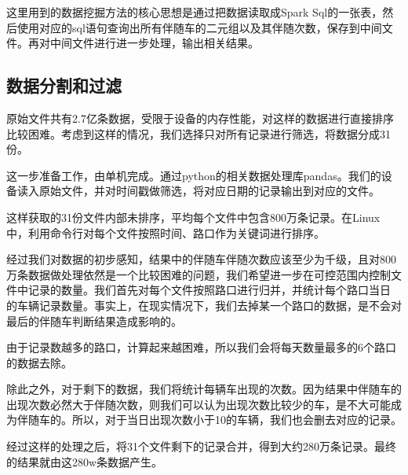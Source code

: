 \documentclass[CJK]{ctexart}
\begin{document}
\begin{multicols}{2}
这里用到的数据挖掘方法的核心思想是通过把数据读取成Spark Sql的一张表，然后使用对应的sql语句查询出所有伴随车的二元组以及其伴随次数，保存到中间文件。再对中间文件进行进一步处理，输出相关结果。
\subsection{数据分割和过滤}
原始文件共有2.7亿条数据，受限于设备的内存性能，对这样的数据进行直接排序比较困难。考虑到这样的情况，我们选择只对所有记录进行筛选，将数据分成31份。

这一步准备工作，由单机完成。通过python的相关数据处理库pandas。我们的设备读入原始文件，并对时间戳做筛选，将对应日期的记录输出到对应的文件。

这样获取的31份文件内部未排序，平均每个文件中包含800万条记录。在Linux中，利用命令行对每个文件按照时间、路口作为关键词进行排序。

经过我们对数据的初步感知，结果中的伴随车伴随次数应该至少为千级，且对800万条数据做处理依然是一个比较困难的问题，我们希望进一步在可控范围内控制文件中记录的数量。我们首先对每个文件按照路口进行归并，并统计每个路口当日
的车辆记录数量。事实上，在现实情况下，我们去掉某一个路口的数据，是不会对最后的伴随车判断结果造成影响的。

由于记录数越多的路口，计算起来越困难，所以我们会将每天数量最多的6个路口的数据去除。

除此之外，对于剩下的数据，我们将统计每辆车出现的次数。因为结果中伴随车的出现次数必然大于伴随次数，则我们可以认为出现次数比较少的车，是不大可能成为伴随车的。所以，对于当日出现次数小于10的车辆，我们也会删去对应的记录。

经过这样的处理之后，将31个文件剩下的记录合并，得到大约280万条记录。最终的结果就由这280w条数据产生。


\end{multicols}
\end{document}
